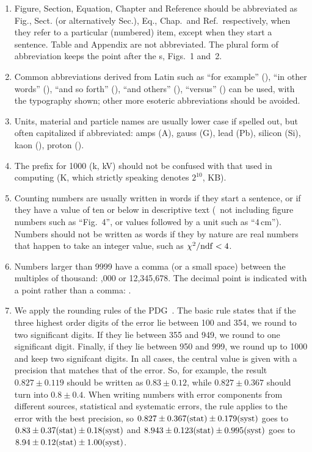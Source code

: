 \begin{enumerate}
\item Figure, Section, Equation, Chapter and Reference should be
  abbreviated as Fig., Sect. (or alternatively Sec.), Eq., Chap.\ and
  Ref.\ respectively, when they refer to a particular (numbered) item,
  except when they start a sentence. Table and Appendix are not
  abbreviated.  The plural form of abbreviation keeps the point after
  the s, \eg Figs.~1 and~2.

\item Common abbreviations derived from Latin such as ``for example''
  (\eg), ``in other words'' (\ie), ``and so forth'' (\etc), ``and
  others'' (\etal), ``versus'' (\vs) can be used, with the typography
  shown; other more esoteric abbreviations should be avoided.

\item Units, material and particle names are usually lower case if
  spelled out, but often capitalized if abbreviated: amps (A), gauss
  (G), lead (Pb), silicon (Si), kaon (\kaon), proton (\proton).

\item The prefix for 1000 (k, \eg kV) should not be confused with
  that used in computing (K, which strictly speaking denotes $2^{10}$,
  \eg KB).

\item Counting numbers are usually written in words if they start a
  sentence, or if they have a value of ten or below in descriptive
  text (\ie\ not including figure numbers such as ``Fig.\ 4'', or
  values followed by a unit such as ``4\,cm''). Numbers should not be
  written as words if they by nature are real numbers that happen to
  take an integer value, such as $\chi^2/\rm{ndf} < 4$.

\item Numbers larger than 9999 have a comma (or a small space) between
  the multiples of thousand: ,000 or 12,345,678.  The decimal
  point is indicated with a point rather than a comma: .

\item We apply the rounding rules of the
  PDG~\cite{PDG2012}. The basic rule states that if the three
  highest order digits of the error lie between 100 and 354, we round
  to two significant digits. If they lie between 355 and 949, we round
  to one significant digit. Finally, if they lie between 950 and 999,
  we round up to 1000 and keep two signifcant digits. In all cases,
  the central value is given with a precision that matches that of the
  error. So, for example, the result $0.827 \pm 0.119$ should be
  written as $0.83\pm 0.12$, while $0.827\pm 0.367$ should turn into
  $0.8\pm 0.4$. When writing numbers with error components from
  different sources, \ie statistical and systematic errors, the rule
  applies to the error with the best precision, so $0.827\pm
  0.367\mathrm{(stat)}\pm 0.179\mathrm{(syst)}$ goes to $0.83\pm 0.37\mathrm{(stat)}\pm 0.18\mathrm{(syst)}$ and
  $8.943\pm 0.123\mathrm{(stat)}\pm 0.995\mathrm{(syst)}$ goes to $8.94\pm 0.12\mathrm{(stat)}\pm
  1.00\mathrm{(syst)}$.


\end{enumerate}
